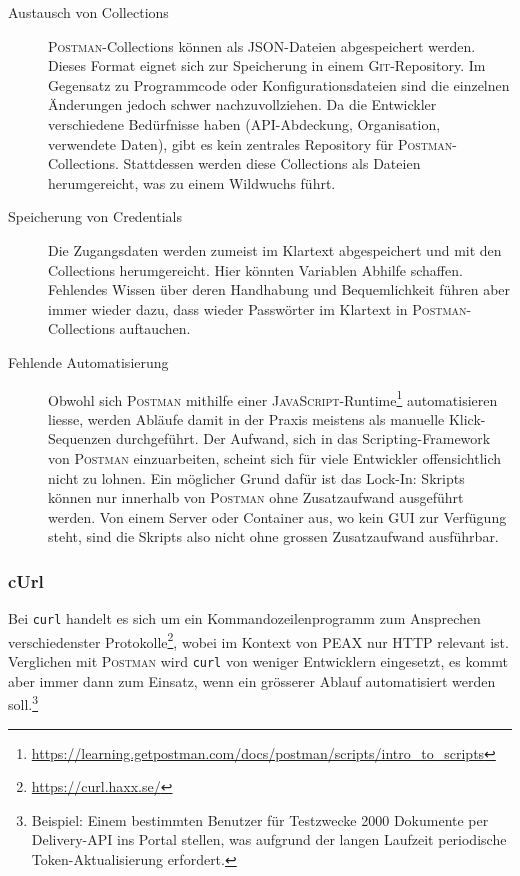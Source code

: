 \begin{description}
    \item[Austausch von Collections] \textsc{Postman}-Collections können als JSON-Dateien abgespeichert werden. Dieses Format eignet sich zur Speicherung in einem \textsc{Git}-Repository. Im Gegensatz zu Programmcode oder Konfigurationsdateien sind die einzelnen Änderungen jedoch schwer nachzuvollziehen. Da die Entwickler verschiedene Bedürfnisse haben (API-Abdeckung, Organisation, verwendete Daten), gibt es kein zentrales Repository für \textsc{Postman}-Collections. Stattdessen werden diese Collections als Dateien herumgereicht, was zu einem Wildwuchs führt.
    \item[Speicherung von Credentials] Die Zugangsdaten werden zumeist im Klartext abgespeichert und mit den Collections herumgereicht. Hier könnten Variablen Abhilfe schaffen. Fehlendes Wissen über deren Handhabung und Bequemlichkeit führen aber immer wieder dazu, dass wieder Passwörter im Klartext in \textsc{Postman}-Collections auftauchen.
    \item[Fehlende Automatisierung] Obwohl sich \textsc{Postman} mithilfe einer \textsc{JavaScript}-Runtime\footnote{\url{https://learning.getpostman.com/docs/postman/scripts/intro_to_scripts}} automatisieren liesse, werden Abläufe damit in der Praxis meistens als manuelle Klick-Sequenzen durchgeführt. Der Aufwand, sich in das Scripting-Framework von \textsc{Postman} einzuarbeiten, scheint sich für viele Entwickler offensichtlich nicht zu lohnen. Ein möglicher Grund dafür ist das Lock-In: Skripts können nur innerhalb von \textsc{Postman} ohne Zusatzaufwand ausgeführt werden. Von einem Server oder Container aus, wo kein GUI zur Verfügung steht, sind die Skripts also nicht ohne grossen Zusatzaufwand ausführbar.
\end{description}

\subsubsection{cUrl}
\label{sec:cUrl}

Bei \texttt{curl} handelt es sich um ein Kommandozeilenprogramm zum Ansprechen verschiedenster Protokolle\footnote{\url{https://curl.haxx.se/}}, wobei im Kontext von PEAX nur HTTP relevant ist. Verglichen mit \textsc{Postman} wird \texttt{curl} von weniger Entwicklern eingesetzt, es kommt aber immer dann zum Einsatz, wenn ein grösserer Ablauf automatisiert werden soll.\footnote{Beispiel: Einem bestimmten Benutzer für Testzwecke 2000 Dokumente per Delivery-API ins Portal stellen, was aufgrund der langen Laufzeit periodische Token-Aktualisierung erfordert.}

